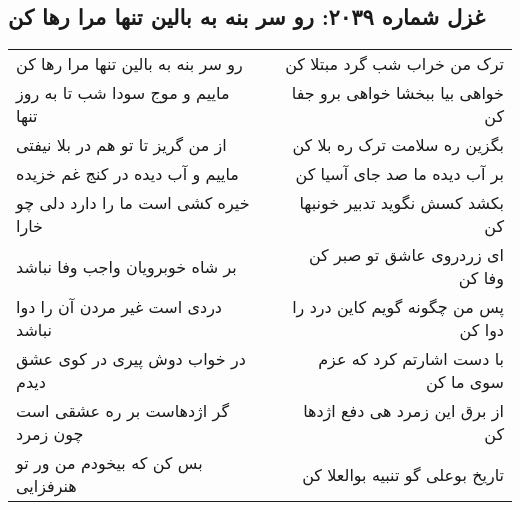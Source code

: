 \begin{center}
\section*{غزل شماره ۲۰۳۹: رو سر بنه به بالین تنها مرا رها کن}
\label{sec:2039}
\begin{longtable}{l p{0.5cm} r}
رو سر بنه به بالین تنها مرا رها کن
&&
ترک من خراب شب گرد مبتلا کن
\\
ماییم و موج سودا شب تا به روز تنها
&&
خواهی بیا ببخشا خواهی برو جفا کن
\\
از من گریز تا تو هم در بلا نیفتی
&&
بگزین ره سلامت ترک ره بلا کن
\\
ماییم و آب دیده در کنج غم خزیده
&&
بر آب دیده ما صد جای آسیا کن
\\
خیره کشی است ما را دارد دلی چو خارا
&&
بکشد کسش نگوید تدبیر خونبها کن
\\
بر شاه خوبرویان واجب وفا نباشد
&&
ای زردروی عاشق تو صبر کن وفا کن
\\
دردی است غیر مردن آن را دوا نباشد
&&
پس من چگونه گویم کاین درد را دوا کن
\\
در خواب دوش پیری در کوی عشق دیدم
&&
با دست اشارتم کرد که عزم سوی ما کن
\\
گر اژدهاست بر ره عشقی است چون زمرد
&&
از برق این زمرد هی دفع اژدها کن
\\
بس کن که بیخودم من ور تو هنرفزایی
&&
تاریخ بوعلی گو تنبیه بوالعلا کن
\\
\end{longtable}
\end{center}
